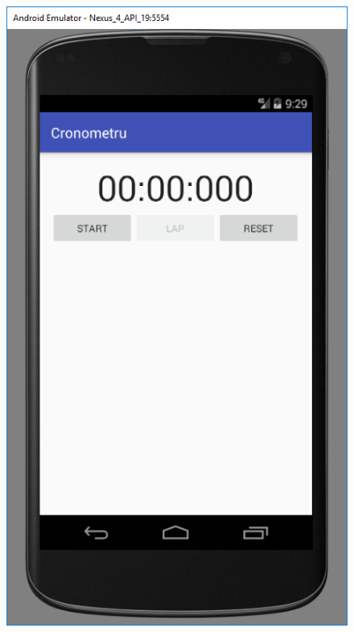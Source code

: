 \begin{figure}[ht]
	\includegraphics[scale=0.5]{imagini/5-reset}
	\centering
\end{figure}

\clearpage